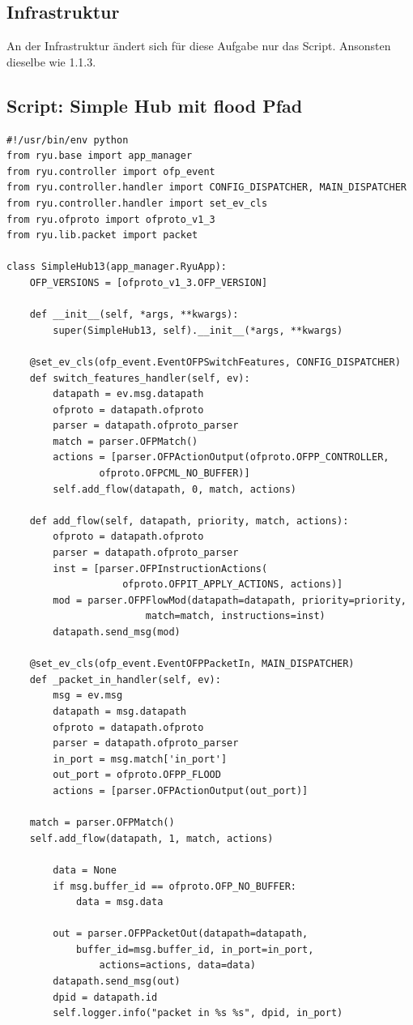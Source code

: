 \documentclass[a4,12pt]{scrartcl}
\begin{document}
\subsection{Infrastruktur}
An der Infrastruktur ändert sich für diese Aufgabe nur das Script. Ansonsten dieselbe wie 1.1.3. 

\subsection{Script: Simple Hub mit flood Pfad}
\begin{lstlisting}
#!/usr/bin/env python
from ryu.base import app_manager
from ryu.controller import ofp_event
from ryu.controller.handler import CONFIG_DISPATCHER, MAIN_DISPATCHER
from ryu.controller.handler import set_ev_cls
from ryu.ofproto import ofproto_v1_3
from ryu.lib.packet import packet

class SimpleHub13(app_manager.RyuApp):
    OFP_VERSIONS = [ofproto_v1_3.OFP_VERSION]

    def __init__(self, *args, **kwargs):
        super(SimpleHub13, self).__init__(*args, **kwargs)

    @set_ev_cls(ofp_event.EventOFPSwitchFeatures, CONFIG_DISPATCHER)
    def switch_features_handler(self, ev):
        datapath = ev.msg.datapath
        ofproto = datapath.ofproto
        parser = datapath.ofproto_parser
        match = parser.OFPMatch()
        actions = [parser.OFPActionOutput(ofproto.OFPP_CONTROLLER, 
        		ofproto.OFPCML_NO_BUFFER)]
        self.add_flow(datapath, 0, match, actions)

    def add_flow(self, datapath, priority, match, actions):
        ofproto = datapath.ofproto
        parser = datapath.ofproto_parser
        inst = [parser.OFPInstructionActions(
        			ofproto.OFPIT_APPLY_ACTIONS, actions)]
        mod = parser.OFPFlowMod(datapath=datapath, priority=priority, 
        				match=match, instructions=inst)
        datapath.send_msg(mod)

    @set_ev_cls(ofp_event.EventOFPPacketIn, MAIN_DISPATCHER)
    def _packet_in_handler(self, ev):
        msg = ev.msg
        datapath = msg.datapath
        ofproto = datapath.ofproto
        parser = datapath.ofproto_parser
        in_port = msg.match['in_port']
        out_port = ofproto.OFPP_FLOOD
        actions = [parser.OFPActionOutput(out_port)]

	match = parser.OFPMatch()
	self.add_flow(datapath, 1, match, actions) 
		
        data = None
        if msg.buffer_id == ofproto.OFP_NO_BUFFER:
            data = msg.data

        out = parser.OFPPacketOut(datapath=datapath, 
        	buffer_id=msg.buffer_id, in_port=in_port, 
        		actions=actions, data=data)
        datapath.send_msg(out)
        dpid = datapath.id
        self.logger.info("packet in %s %s", dpid, in_port)
\end{lstlisting}
\newpage 
\end{document}
